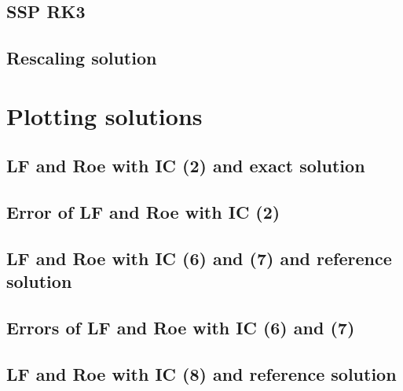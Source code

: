 \documentclass[11pt,a4paper]{article}
\begin{document}
\subsection{SSP RK3}\label{ssp}


\subsection{Rescaling solution}\label{rescale}


\section{Plotting solutions}\label{plot}

\subsection{LF and Roe with IC (2) and exact solution}\label{plot_IC_1}


\subsection{Error of LF and Roe with IC (2)}\label{plot_IC_1_error}


\subsection{LF and Roe with IC (6) and (7) and reference solution}\label{plot_IC_2/3}


\subsection{Errors of LF and Roe with IC (6) and (7)}\label{plot_IC_2/3_error}


\subsection{LF and Roe with IC (8) and reference solution}\label{plot_IC_4}

\end{document}
